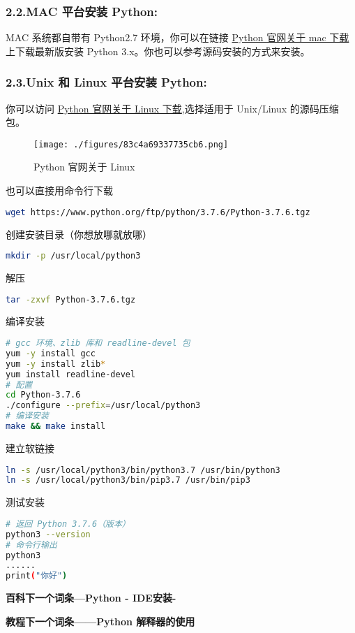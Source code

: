 \subsubsection{2.2.MAC 平台安装 Python:}
MAC 系统都自带有 Python2.7 环境，你可以在链接 \href{https://www.python.org/downloads/mac-osx/}{Python 官网关于 mac 下载} 上下载最新版安装 Python 3.x。你也可以参考源码安装的方式来安装。

\subsubsection{2.3.Unix 和 Linux 平台安装 Python:}
你可以访问 \href{https://www.python.org/downloads/source/}{Python 官网关于 Linux 下载},选择适用于 Unix/Linux 的源码压缩包。
\begin{figure}[ht]
\centering
\texttt{[image: ./figures/83c4a69337735cb6.png]}
\caption{Python 官网关于 Linux} \label{fig_Python_2}
\end{figure}

也可以直接用命令行下载
\begin{lstlisting}[language=bash]
wget https://www.python.org/ftp/python/3.7.6/Python-3.7.6.tgz
\end{lstlisting}

创建安装目录（你想放哪就放哪）
\begin{lstlisting}[language=bash]
mkdir -p /usr/local/python3
\end{lstlisting}

解压
\begin{lstlisting}[language=bash]
tar -zxvf Python-3.7.6.tgz
\end{lstlisting}

编译安装
\begin{lstlisting}[language=bash]
# gcc 环境、zlib 库和 readline-devel 包
yum -y install gcc
yum -y install zlib*
yum install readline-devel
# 配置
cd Python-3.7.6
./configure --prefix=/usr/local/python3
# 编译安装
make && make install
\end{lstlisting}

建立软链接
\begin{lstlisting}[language=bash]
ln -s /usr/local/python3/bin/python3.7 /usr/bin/python3
ln -s /usr/local/python3/bin/pip3.7 /usr/bin/pip3
\end{lstlisting}

测试安装
\begin{lstlisting}[language=bash]
# 返回 Python 3.7.6（版本）
python3 --version
# 命令行输出
python3
......
print("你好")
\end{lstlisting}

\textbf{百科下一个词条—Python - IDE安装-}

\textbf{教程下一个词条——Python 解释器的使用}
